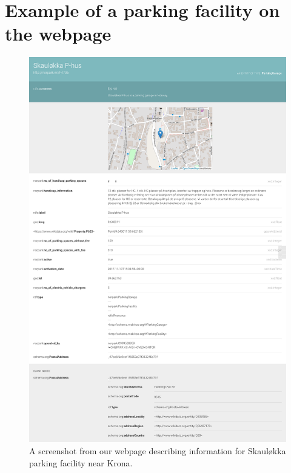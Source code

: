 \chapter{Example of a parking facility on the webpage}
\label{appendix:webpage}
\begin{figure}[H]
	\centering
	\includegraphics[scale=0.20]{figures/parking-place-screenshot.png}
	\caption{A screenshot from our webpage describing information for Skauløkka parking facility near Krona.}
\end{figure}

